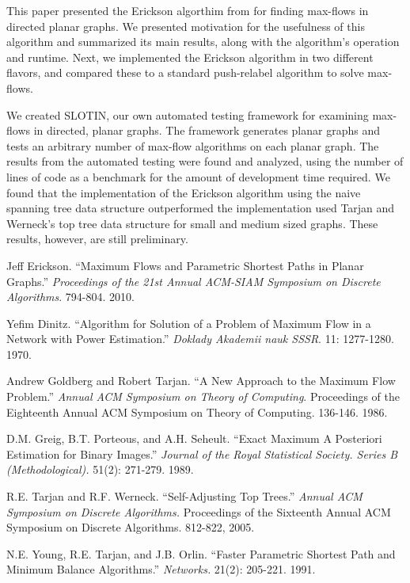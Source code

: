 \documentclass[12pt]{article}
\begin{document}
This paper presented the Erickson algorthim from \cite{erickson2010} for finding max-flows in directed planar graphs. We presented motivation for the usefulness of this algorithm and summarized its main results, along with the algorithm's operation and runtime. Next, we implemented the Erickson algorithm in two different flavors, and compared these to a standard push-relabel algorithm to solve max-flows. 

We created SLOTIN, our own automated testing framework for examining max-flows in directed, planar graphs. The framework generates planar graphs and tests an arbitrary number of max-flow algorithms on each planar graph. The results from the automated testing were found and analyzed, using the number of lines of code as a benchmark for the amount of development time required. We found that the implementation of the Erickson algorithm using the naive spanning tree data structure outperformed the implementation used Tarjan and Werneck's top tree data structure for small and medium sized graphs. These results, however, are still preliminary.

\newpage

\begin{thebibliography}{9}

        Jeff Erickson.
       ``Maximum Flows and Parametric Shortest Paths in Planar Graphs.''
       \emph{Proceedings of the 21st Annual ACM-SIAM Symposium on Discrete Algorithms}.
       794-804.
       2010.

        Yefim Dinitz.
        ``Algorithm for Solution of a Problem of Maximum Flow in a Network with Power Estimation.''
        \emph{Doklady Akademii nauk SSSR}.
        11: 1277-1280.
        1970.

        Andrew Goldberg and Robert Tarjan.
        ``A New Approach to the Maximum Flow Problem.''
        \emph{Annual ACM Symposium on Theory of Computing}.
        Proceedings of the Eighteenth Annual ACM Symposium on Theory of Computing.
        136-146.
        1986.

        D.M. Greig, B.T. Porteous, and A.H. Seheult.
        ``Exact Maximum A Posteriori Estimation for Binary Images.''
        \emph{Journal of the Royal Statistical Society. Series B (Methodological).}
        51(2): 271-279.
        1989.

        R.E. Tarjan and R.F. Werneck.
        ``Self-Adjusting Top Trees.''
        \emph{Annual ACM Symposium on Discrete Algorithms.}
        Proceedings of the Sixteenth Annual ACM Symposium on Discrete Algorithms.
        812-822,
        2005.

        N.E. Young, R.E. Tarjan, and J.B. Orlin. 
        ``Faster Parametric Shortest Path and Minimum Balance Algorithms.''
        \emph{Networks.}
        21(2): 205-221.
        1991.

\end{thebibliography}
\end{document}
